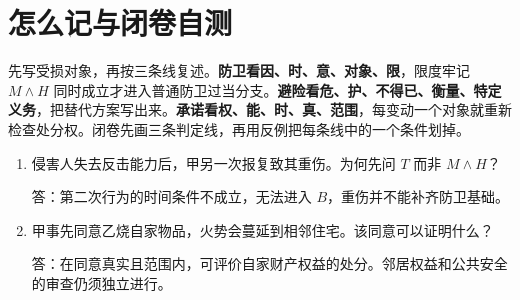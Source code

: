 \section*{怎么记与闭卷自测}
先写受损对象，再按三条线复述。\textbf{防卫看因、时、意、对象、限}，限度牢记 \(M\land H\) 同时成立才进入普通防卫过当分支。\textbf{避险看危、护、不得已、衡量、特定义务}，把替代方案写出来。\textbf{承诺看权、能、时、真、范围}，每变动一个对象就重新检查处分权。闭卷先画三条判定线，再用反例把每条线中的一个条件划掉。
\begin{enumerate}
\item 侵害人失去反击能力后，甲另一次报复致其重伤。为何先问 \(T\) 而非 \(M\land H\)？\par
答：第二次行为的时间条件不成立，无法进入 \(B\)，重伤并不能补齐防卫基础。
\item 甲事先同意乙烧自家物品，火势会蔓延到相邻住宅。该同意可以证明什么？\par
答：在同意真实且范围内，可评价自家财产权益的处分。邻居权益和公共安全的审查仍须独立进行。
\end{enumerate}
